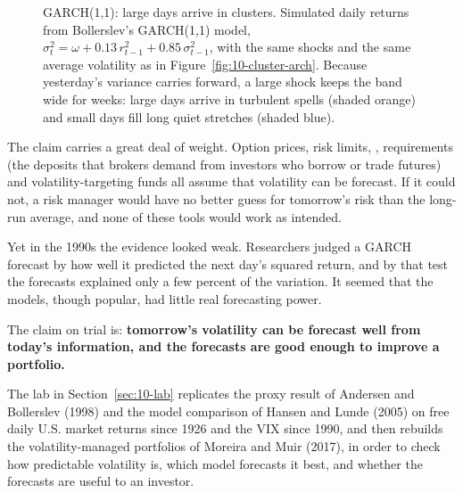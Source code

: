 \begin{figure}[htbp]
{%
}
\caption[GARCH(1,1): large days arrive in clusters]{GARCH(1,1): large days arrive in clusters. Simulated daily returns from Bollerslev's GARCH(1,1) model, $\sigma_t^2 = \omega + 0.13\,r_{t-1}^2 + 0.85\,\sigma_{t-1}^2$, with the same shocks and the same average volatility as in Figure~\ref{fig:10-cluster-arch}. Because yesterday's variance carries forward, a large shock keeps the band wide for weeks: large days arrive in turbulent spells (shaded orange) and small days fill long quiet stretches (shaded blue).}
\label{fig:10-cluster-garch}
\end{figure}


The claim carries a great deal of weight. Option prices, risk limits, \label{kt:value-at-risk},  requirements (the deposits that brokers demand from investors who borrow or trade futures) and volatility-targeting funds all assume that volatility can be forecast. If it could not, a risk manager would have no better guess for tomorrow's risk than the long-run average, and none of these tools would work as intended.

Yet in the 1990s the evidence looked weak. Researchers judged a GARCH forecast by how well it predicted the next day's squared return, and by that test the forecasts explained only a few percent of the variation. It seemed that the models, though popular, had little real forecasting power.

The claim on trial is: \textbf{tomorrow's volatility can be forecast well from today's information, and the forecasts are good enough to improve a portfolio.}

The lab in Section~\ref{sec:10-lab} replicates the proxy result of Andersen and Bollerslev (1998) and the model comparison of Hansen and Lunde (2005) on free daily U.S. market returns since 1926 and the VIX since 1990, and then rebuilds the volatility-managed portfolios of Moreira and Muir (2017), in order to check how predictable volatility is, which model forecasts it best, and whether the forecasts are useful to an investor.

